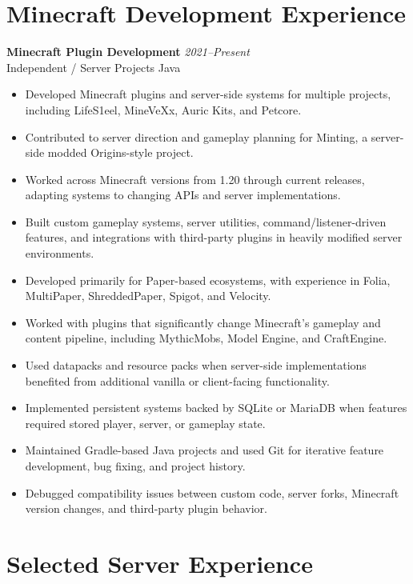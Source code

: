 \documentclass[10pt,letterpaper]{article}
\newcommand{\role}[4]{
  \textbf{#1} \hfill \textit{#2}\\
  \textcolor{textgray}{#3} \hfill \textcolor{textgray}{#4}
  \vspace{2pt}
}
\begin{document}
\section{Minecraft Development Experience}

\role{Minecraft Plugin Development}{2021--Present}{Independent / Server Projects}{Java}

\begin{itemize}
  \item Developed Minecraft plugins and server-side systems for multiple projects,
        including LifeS1eel, MineVeXx, Auric Kits, and Petcore.
  \item Contributed to server direction and gameplay planning for Minting, a
        server-side modded Origins-style project.
  \item Worked across Minecraft versions from 1.20 through current releases,
        adapting systems to changing APIs and server implementations.
  \item Built custom gameplay systems, server utilities, command/listener-driven
        features, and integrations with third-party plugins in heavily modified
        server environments.
  \item Developed primarily for Paper-based ecosystems, with experience in
        Folia, MultiPaper, ShreddedPaper, Spigot, and Velocity.
  \item Worked with plugins that significantly change Minecraft's gameplay and
        content pipeline, including MythicMobs, Model Engine, and CraftEngine.
  \item Used datapacks and resource packs when server-side implementations
        benefited from additional vanilla or client-facing functionality.
  \item Implemented persistent systems backed by SQLite or MariaDB when features
        required stored player, server, or gameplay state.
  \item Maintained Gradle-based Java projects and used Git for iterative feature
        development, bug fixing, and project history.
  \item Debugged compatibility issues between custom code, server forks,
        Minecraft version changes, and third-party plugin behavior.
\end{itemize}

\section{Selected Server Experience}
\end{document}
